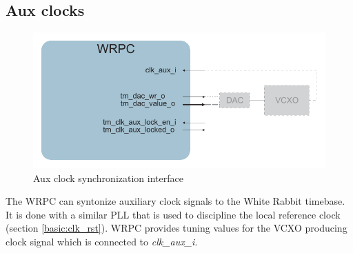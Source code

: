 \subsection{Aux clocks}

\begin{figure}[ht]
  \begin{center}
    \includegraphics[width=.8\textwidth]{fig/adv_wrpc_clk.pdf}
    \caption{Aux clock synchronization interface}
  \end{center}
\end{figure}

The WRPC can syntonize auxiliary clock signals to the White Rabbit timebase. It
is done with a similar PLL that is used to discipline the local reference clock
(section \ref{basic:clk_rst}). WRPC provides tuning values for the VCXO producing
clock signal which is connected to \emph{clk\_aux\_i}.

\begin{hdlporttable}
\end{hdlporttable}

